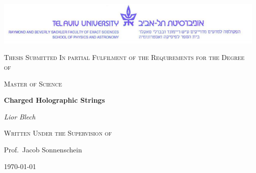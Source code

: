 \documentclass[11pt,a4paper]{article}
\begin{document}
\lstset{language=Mathematica} 


\flushbottom
\pagebreak
\begin{titlepage}
	\centering
	\includegraphics[scale=0.65]{figures/TAUlogo.png}\par\vspace{1cm}
	\vspace{1cm}
	{\scshape\Large Thesis Submitted In partial Fulfilment of the Requirements for the Degree of\par}
	\vspace{1cm}
	{\scshape\Large Master of Science\par}
	\vspace{1.5cm}
	{\huge\bfseries Charged Holographic Strings\par}
	\vspace{2cm}
	{\Large\itshape Lior Blech\par}
	\vfill
	{\scshape\Large Written Under the Supervision of\par
	Prof.~Jacob Sonnenschein}

	\vfill

	{\large \today\par}
\end{titlepage}
\begin{abstract}
We revisit the holographic description of hadrons, adding an electromagnetic interaction term and taking account of one loop corrections through a casimir energy term. We first review the theoretical background: AdS/CFT correspondence, confining gravitational backgrounds and the approximating model of the spinning string with endpoint masses, including the one loop quantum corrections. We then analyse the effect of adding the electromagnetic charges and the casimir energy. Finally we confront the results with PDG data by fitting to the Regge trajectories and attempt to further constrict the parameter space through the determination of the mass difference between the up and down quarks.
\end{abstract}
\pagebreak
\tableofcontents
\end{document}
